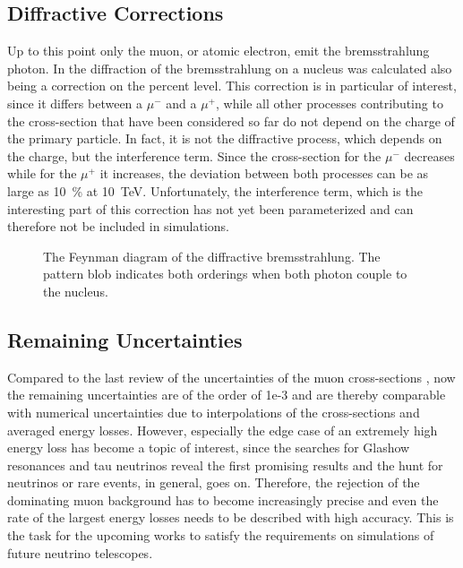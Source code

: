 \subsection{Diffractive Corrections}

Up to this point only the muon, or atomic electron, emit the bremsstrahlung photon.
In \cite{Kelner99BremsDiffract} the diffraction of the bremsstrahlung on a nucleus was calculated also being a correction on the percent level.
This correction is in particular of interest, since it differs between a $\mu^-$ and a $\mu^+$, while all other processes contributing to the cross-section that have been considered so far do not depend on the charge of the primary particle.
In fact, it is not the diffractive process, which depends on the charge, but the interference term.
Since the cross-section for the $\mu^-$ decreases while for the $\mu^+$ it increases, the deviation between both processes can be as large as \SI{10}{\%} at \SI{10}{TeV}.
Unfortunately, the interference term, which is the interesting part of this correction has not yet been parameterized and can therefore not be included in simulations.
\begin{figure}
    \centering
    
    \caption{The Feynman diagram of the diffractive bremsstrahlung. The pattern blob indicates both orderings when both photon couple to the nucleus.}
    \label{fig:feyn_brems_diffract}
\end{figure}

\subsection{Remaining Uncertainties}

Compared to the last review of the uncertainties of the muon cross-sections \cite{Kokoulin99}, now the remaining uncertainties are of the order of 1e-3 and are thereby comparable with numerical uncertainties due to interpolations of the cross-sections and averaged energy losses.
However, especially the edge case of an extremely high energy loss has become a topic of interest, since the searches for Glashow resonances and tau neutrinos reveal the first promising results and the hunt for neutrinos or rare events, in general, goes on.
Therefore, the rejection of the dominating muon background has to become increasingly precise and even the rate of the largest energy losses needs to be described with high accuracy.
This is the task for the upcoming works to satisfy the requirements on simulations of future neutrino telescopes.

